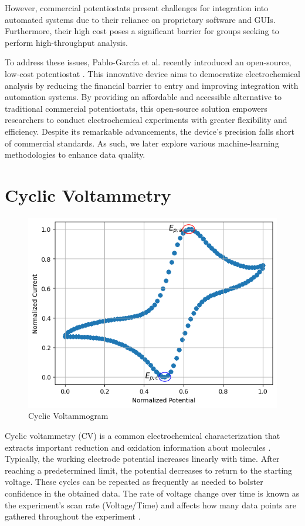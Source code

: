 However, commercial potentiostats present challenges for integration into automated systems due to their reliance on proprietary software and GUIs. Furthermore, their high cost poses a significant barrier for groups seeking to perform high-throughput analysis.

To address these issues, Pablo-García et al. recently introduced an open-source, low-cost potentiostat \cite{PabloGarca2024}. This innovative device aims to democratize electrochemical analysis by reducing the financial barrier to entry and improving integration with automation systems. By providing an affordable and accessible alternative to traditional commercial potentiostats, this open-source solution empowers researchers to conduct electrochemical experiments with greater flexibility and efficiency. Despite its remarkable advancements, the device's precision falls short of commercial standards. As such, we later explore various machine-learning methodologies to enhance data quality. 
\section{Cyclic Voltammetry}
\begin{figure}[h!]
  \centering
    \includegraphics[width=1.0\textwidth]{figures/cv_example.png}
    \caption{Cyclic Voltammogram}
    \label{cv_example}
\end{figure}
Cyclic voltammetry (CV) is a common electrochemical characterization that extracts important reduction and oxidation information about molecules \cite{doi:10.1021/ac60210a007}. Typically, the working electrode potential increases linearly with time. After reaching a predetermined limit, the potential decreases to return to the starting voltage. These cycles can be repeated as frequently as needed to bolster confidence in the obtained data. The rate of voltage change over time is known as the experiment's scan rate \mbox{(Voltage/Time)} and affects how many data points are gathered throughout the experiment \cite{https://doi.org/10.1002/anie.198408313}. 

